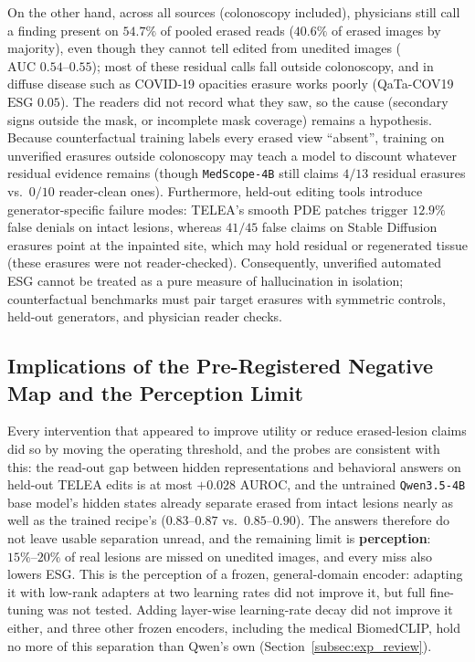 \documentclass[journal]{IEEEtran}
\begin{document}
On the other hand, across all sources (colonoscopy included), physicians still call a finding present on $54.7\%$ of pooled erased reads ($40.6\%$ of erased images by majority), even though they cannot tell edited from unedited images ($\text{AUC } 0.54\text{--}0.55$); most of these residual calls fall outside colonoscopy, and in diffuse disease such as COVID-19 opacities erasure works poorly (QaTa-COV19 $\text{ESG } 0.05$). The readers did not record what they saw, so the cause (secondary signs outside the mask, or incomplete mask coverage) remains a hypothesis. Because counterfactual training labels every erased view ``absent'', training on unverified erasures outside colonoscopy may teach a model to discount whatever residual evidence remains (though \texttt{MedScope-4B} still claims $4/13$ residual erasures vs.\ $0/10$ reader-clean ones). Furthermore, held-out editing tools introduce generator-specific failure modes: TELEA's smooth PDE patches trigger $12.9\%$ false denials on intact lesions, whereas $41/45$ false claims on Stable Diffusion erasures point at the inpainted site, which may hold residual or regenerated tissue (these erasures were not reader-checked). Consequently, unverified automated ESG cannot be treated as a pure measure of hallucination in isolation; counterfactual benchmarks must pair target erasures with symmetric controls, held-out generators, and physician reader checks.

\subsection{Implications of the Pre-Registered Negative Map and the Perception Limit}
\label{subsec:disc_negative_map}
Every intervention that appeared to improve utility or reduce erased-lesion claims did so by moving the operating threshold, and the probes are consistent with this: the read-out gap between hidden representations and behavioral answers on held-out TELEA edits is at most $+0.028$ AUROC, and the untrained \texttt{Qwen3.5-4B} base model's hidden states already separate erased from intact lesions nearly as well as the trained recipe's ($0.83\text{--}0.87$ vs.\ $0.85\text{--}0.90$). The answers therefore do not leave usable separation unread, and the remaining limit is \textbf{perception}: $15\%\text{--}20\%$ of real lesions are missed on unedited images, and every miss also lowers ESG. This is the perception of a frozen, general-domain encoder: adapting it with low-rank adapters at two learning rates did not improve it, but full fine-tuning was not tested. Adding layer-wise learning-rate decay did not improve it either, and three other frozen encoders, including the medical BiomedCLIP, hold no more of this separation than Qwen's own (Section~\ref{subsec:exp_review}).
\end{document}
